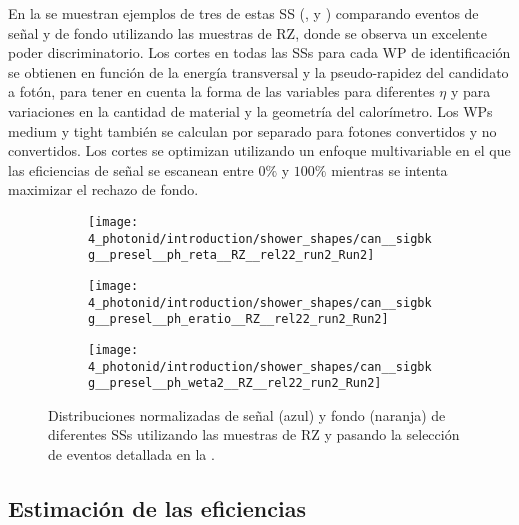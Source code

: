En la \Fig{\ref{fig:pid_ss:optimisation:shower_shapes}} se muestran ejemplos de tres de estas \ac{SS} (\reta, \eratio y \weta) comparando eventos de señal y de fondo utilizando las muestras de \ac{RZ}, donde se observa un excelente poder discriminatorio.
Los cortes en todas las \acp{SS} para cada \ac{WP} de identificación se obtienen en función de la energía transversal y la pseudo-rapidez del candidato a fotón, para tener en cuenta la forma de las variables para diferentes \(\eta\) y para variaciones en la cantidad de material y la geometría del calorímetro. Los \acp{WP} medium y tight también se calculan por separado para fotones convertidos y no convertidos.
Los cortes se optimizan utilizando un enfoque multivariable en el que las eficiencias de señal se escanean entre \(0\%\) y \(100\%\) mientras se intenta maximizar el rechazo de fondo.

\begin{figure}[ht!]
    \centering
    \begin{subfigure}[h]{0.32\linewidth}
        \centering
        \texttt{[image: 4\_photonid/introduction/shower\_shapes/can\_\_sigbkg\_\_presel\_\_ph\_reta\_\_RZ\_\_rel22\_run2\_Run2]}
        \caption{\reta}
        \label{fig:pid_ss:optimisation:shower_shapes:reta}
    \end{subfigure}
    \hfill
    \begin{subfigure}[h]{0.32\linewidth}
        \centering
        \texttt{[image: 4\_photonid/introduction/shower\_shapes/can\_\_sigbkg\_\_presel\_\_ph\_eratio\_\_RZ\_\_rel22\_run2\_Run2]}
        \caption{\eratio}
        \label{fig:pid_ss:optimisation:shower_shapes:eratio}
    \end{subfigure}
    \hfill
    \begin{subfigure}[h]{0.32\linewidth}
        \centering
        \texttt{[image: 4\_photonid/introduction/shower\_shapes/can\_\_sigbkg\_\_presel\_\_ph\_weta2\_\_RZ\_\_rel22\_run2\_Run2]}
        \caption{\weta}
        \label{fig:pid_ss:optimisation:shower_shapes:weta2}
    \end{subfigure}
    \caption{Distribuciones normalizadas de se\~nal (azul) y fondo (naranja) de diferentes \acp{SS} utilizando las muestras de \ac{RZ} y pasando la selección de eventos detallada en la \Sect{\ref{subsec:pid_ss:pid:event_selection}}.}
    \label{fig:pid_ss:optimisation:shower_shapes}
\end{figure}



\subsection{Estimación de las eficiencias}

